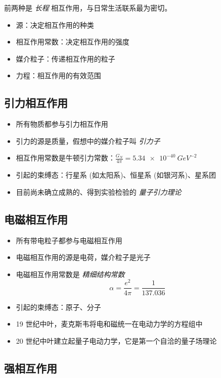 \documentclass[oneside,a4paper,openany,11pt]{ctexbook}
\begin{document}
前两种是 \emph{长程} 相互作用，与日常生活联系最为密切。

\begin{itemize}
    \item 源：决定相互作用的种类
    \item 相互作用常数：决定相互作用的强度
    \item 媒介粒子：传递相互作用的粒子
    \item 力程：相互作用的有效范围
\end{itemize}

\subsection{引力相互作用}

\begin{itemize}
    \item 所有物质都参与引力相互作用
    \item 引力的源是质量，假想中的媒介粒子叫 \emph{引力子}
    \item 相互作用常数是牛顿引力常数：$\frac{G_N}{4\pi}=\qty{5.34e-40}{GeV^{-2}}$
    \item 引起的束缚态：行星系 (如太阳系)、恒星系 (如银河系)、星系团
    \item 目前尚未确立成熟的、得到实验检验的 \emph{量子引力理论}
\end{itemize}

\subsection{电磁相互作用}

\begin{itemize}
    \item 所有带电粒子都参与电磁相互作用
    \item 电磁相互作用的源是电荷，媒介粒子是光子
    \item 电磁相互作用常数是 \emph{精细结构常数}
        \begin{equation}
            \alpha = \frac{e^2}{4\pi} = \frac{1}{137.036}
        \end{equation}
    \item 引起的束缚态：原子、分子
    \item 19 世纪中叶，麦克斯韦将电和磁统一在电动力学的方程组中
    \item 20 世纪中叶建立起量子电动力学，它是第一个自洽的量子场理论
\end{itemize}

\subsection{强相互作用}
\end{document}
